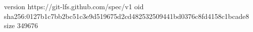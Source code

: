 version https://git-lfs.github.com/spec/v1
oid sha256:0127b1c7bb2bc51c3e9d519675d2cd482532509441bd0376c8fd4158c1bcade8
size 349676

